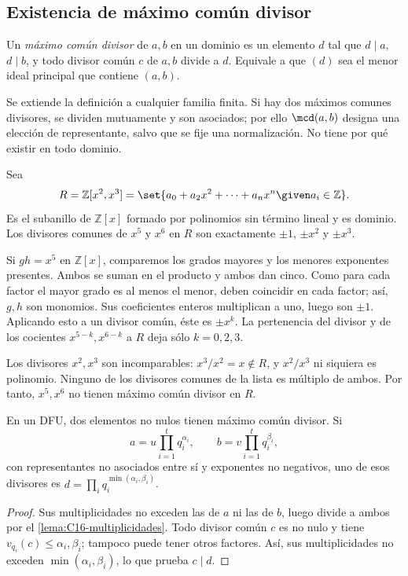 \subsection{Existencia de máximo común divisor}
\begin{defi}
Un \emph{máximo común divisor} de $a,b$ en un dominio es un elemento $d$ tal que $d\mid a$, $d\mid b$, y todo divisor común $c$ de $a,b$ divide a $d$. Equivale a que $(d)$ sea el menor ideal principal que contiene $(a,b)$.
\end{defi}
Se extiende la definición a cualquier familia finita. Si hay dos máximos comunes divisores, se dividen mutuamente y son asociados; por ello $\mcd(a,b)$ designa una elección de representante, salvo que se fije una normalización. No tiene por qué existir en todo dominio.

\begin{ejem}
Sea
\[
R=\mathbb Z[x^2,x^3]
=\set{a_0+a_2x^2+\cdots+a_nx^n\given a_i\in\mathbb Z}.
\]
Es el subanillo de $\mathbb Z[x]$ formado por polinomios sin término lineal y es dominio. Los divisores comunes de $x^5$ y $x^6$ en $R$ son exactamente $\pm1$, $\pm x^2$ y $\pm x^3$.

Si $gh=x^5$ en $\mathbb Z[x]$, comparemos los grados mayores y los menores exponentes presentes. Ambos se suman en el producto y ambos dan cinco. Como para cada factor el mayor grado es al menos el menor, deben coincidir en cada factor; así, $g,h$ son monomios. Sus coeficientes enteros multiplican a uno, luego son $\pm1$. Aplicando esto a un divisor común, éste es $\pm x^k$. La pertenencia del divisor y de los cocientes $x^{5-k},x^{6-k}$ a $R$ deja sólo $k=0,2,3$.

Los divisores $x^2,x^3$ son incomparables: $x^3/x^2=x\notin R$, y $x^2/x^3$ ni siquiera es polinomio. Ninguno de los divisores comunes de la lista es múltiplo de ambos. Por tanto, $x^5,x^6$ no tienen máximo común divisor en $R$.
\end{ejem}

\begin{lema}\label{lema:C16-mcd}
En un DFU, dos elementos no nulos tienen máximo común divisor. Si
\[
a=u\prod_{i=1}^t q_i^{\alpha_i},\qquad
b=v\prod_{i=1}^t q_i^{\beta_i},
\]
con representantes no asociados entre sí y exponentes no negativos, uno de esos divisores es $d=\prod_i q_i^{\min(\alpha_i,\beta_i)}$.
\end{lema}
\begin{proof}
Sus multiplicidades no exceden las de $a$ ni las de $b$, luego divide a ambos por el \cref{lema:C16-multiplicidades}. Todo divisor común $c$ es no nulo y tiene $v_{q_i}(c)\leq\alpha_i,\beta_i$; tampoco puede tener otros factores. Así, sus multiplicidades no exceden $\min(\alpha_i,\beta_i)$, lo que prueba $c\mid d$.
\end{proof}

